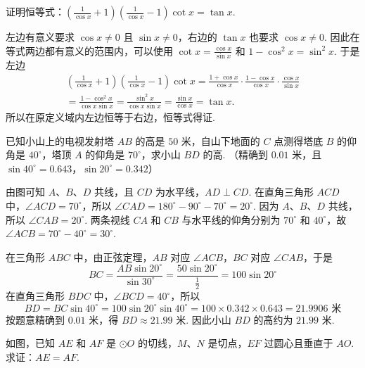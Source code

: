 \begin{problem}
证明恒等式：\(\left(\frac{1}{\cos x}+1\right)\left(\frac{1}{\cos x}-1\right)\cot x=\tan x\).
\end{problem}

\begin{solution}
左边有意义要求 \(\cos x\ne0\) 且 \(\sin x\ne0\)，右边的 \(\tan x\) 也要求 \(\cos x\ne0\). 因此在等式两边都有意义的范围内，可以使用 \(\cot x=\frac{\cos x}{\sin x}\) 和 \(1-\cos^2x=\sin^2x\). 于是左边
\[
\begin{gathered}
\left(\frac{1}{\cos x}+1\right)\left(\frac{1}{\cos x}-1\right)\cot x
=\frac{1+\cos x}{\cos x}\cdot\frac{1-\cos x}{\cos x}\cdot\frac{\cos x}{\sin x} \\
=\frac{1-\cos^2x}{\cos x\sin x}=\frac{\sin^2x}{\cos x\sin x}=\frac{\sin x}{\cos x}=\tan x.
\end{gathered}
\]
所以在原定义域内左边恒等于右边，恒等式得证.
\end{solution}

\begin{problem}
已知小山上的电视发射塔 \(AB\) 的高是 \(50\text{ 米}\)，自山下地面的 \(C\) 点测得塔底 \(B\) 的仰角是 \(40^\circ\)，塔顶 \(A\) 的仰角是 \(70^\circ\)，求小山 \(BD\) 的高. （精确到 \(0.01\text{ 米}\)，且 \(\sin40^\circ=0.643\)，\(\sin20^\circ=0.342\)）

\end{problem}

\begin{solution}
由图可知 \(A\)、\(B\)、\(D\) 共线，且 \(CD\) 为水平线，\(AD\perp CD\). 在直角三角形 \(ACD\) 中，\(\angle ACD=70^\circ\)，所以
\(\angle CAD=180^\circ-90^\circ-70^\circ=20^\circ\). 因为 \(A\)、\(B\)、\(D\) 共线，所以 \(\angle CAB=20^\circ\). 两条视线 \(CA\) 和 \(CB\) 与水平线的仰角分别为 \(70^\circ\) 和 \(40^\circ\)，故 \(\angle ACB=70^\circ-40^\circ=30^\circ\).

在三角形 \(ABC\) 中，由正弦定理，\(AB\) 对应 \(\angle ACB\)，\(BC\) 对应 \(\angle CAB\)，于是
\[
BC=\frac{AB\sin20^\circ}{\sin30^\circ}=\frac{50\sin20^\circ}{\frac{1}{2}}=100\sin20^\circ
\]
在直角三角形 \(BDC\) 中，\(\angle BCD=40^\circ\)，所以
\[
BD=BC\sin40^\circ=100\sin20^\circ\sin40^\circ=100\times0.342\times0.643=21.9906\text{ 米}
\]
按题意精确到 \(0.01\text{ 米}\)，得 \(BD\approx21.99\text{ 米}\). 因此小山 \(BD\) 的高约为 \(21.99\text{ 米}\).
\end{solution}

\begin{problem}
如图，已知 \(AE\) 和 \(AF\) 是 \(\odot O\) 的切线，\(M\)、\(N\) 是切点，\(EF\) 过圆心且垂直于 \(AO\). 求证：\(AE=AF\).

\end{problem}

